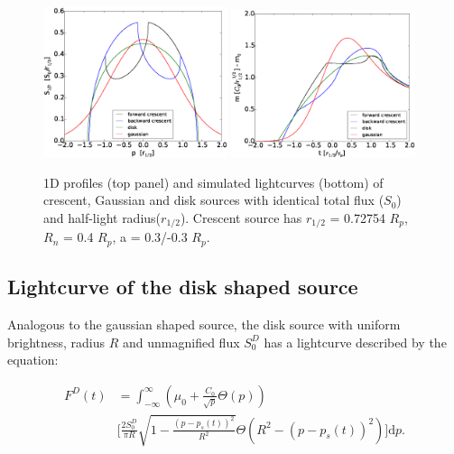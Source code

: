 \documentclass[usenatbib]{mn2e}
\begin{document}
\begin{figure}
\centering
    \includegraphics[width = 0.48\textwidth]{figures/S1D_all.eps}
    \includegraphics[width = 0.48\textwidth]{figures/4source_magnification.eps}
\caption{\label{fig:lightcurve_gauss} 1D profiles (top panel) and simulated lightcurves (bottom) of crescent, Gaussian and disk sources with identical total flux ($S_0$) and half-light radius($r_{1/2}$). Crescent source has $r_{1/2}$ = 0.72754 $R_p$, $R_n$ = 0.4 $R_p$, a = 0.3/-0.3 $R_p$. }
\end{figure}


\subsection{Lightcurve of the disk shaped source}

Analogous to the gaussian shaped source, the disk source with uniform brightness, radius $R$ and 
unmagnified flux $S_0^D$ has a lightcurve described by the equation:

\begin{equation}
\begin{aligned}
 F^D(t) &= \int_{-\infty}^\infty  \left( \mu_0 + \frac{C_0}{\sqrt{p}} \Theta \left( p \right) \right) \\
    & \bigg[ \frac{2 S_0^D}{ \pi R} \sqrt{1 - \frac{\left( p-p_s(t) \right)^2}{R^2}}  \Theta \left(R^2 - \left(p-p_s(t) \right)^2 \right) \bigg] \mathrm{d}p.
\end{aligned}
\end{equation}
\end{document}
